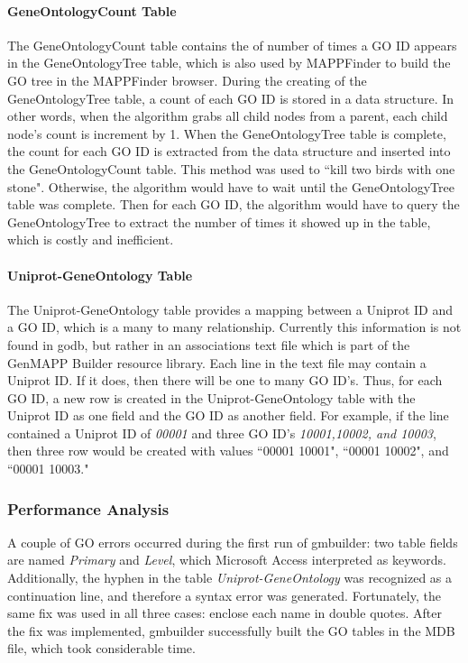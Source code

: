 \paragraph{GeneOntologyCount Table}
The GeneOntologyCount table contains the of number of times a GO ID appears in the GeneOntologyTree table, which
is also used by MAPPFinder to build the GO tree in the MAPPFinder browser. During the creating of the GeneOntologyTree
table, a count of each GO ID is stored in a data structure. In other words, when the algorithm grabs all child nodes from
a parent, each child node's count is increment by 1. When the GeneOntologyTree table is complete, the count for
each GO ID is extracted from the data structure and inserted into the GeneOntologyCount table.
This method was used to ``kill two birds with one stone". Otherwise,
the algorithm would have to wait until the GeneOntologyTree table was complete. Then for each GO ID, the algorithm would have
to query the GeneOntologyTree to extract the number of times it showed up in the table, which is costly and inefficient.


\paragraph{Uniprot-GeneOntology Table}
The Uniprot-GeneOntology table provides a mapping between a Uniprot ID and a GO ID, which is a many to many relationship.
Currently this information is not found in godb, but rather in an associations text file which is part of the GenMAPP Builder
resource library. Each line in the text file may contain a Uniprot ID. If it does, then there will be one to many GO ID's.
Thus, for each GO ID, a new row is created in the Uniprot-GeneOntology table with the Uniprot ID as one field and the GO ID
as another field. For example, if the line contained a Uniprot ID of \emph{00001} and three GO ID's \emph{10001,10002, and 10003},
then three row would be created with values ``00001 10001", ``00001 10002", and ``00001 10003."

\subsubsection{Performance Analysis}
A couple of GO errors occurred during the first run of gmbuilder: two table fields are named \emph{Primary} and \emph{Level}, which
Microsoft Access interpreted as keywords. Additionally, the hyphen in the table \emph{Uniprot-GeneOntology}
was recognized  as a continuation line, and therefore a syntax error was generated. Fortunately, the same fix was used
in all three cases: enclose each name in double quotes. After the fix was implemented, gmbuilder successfully built the
GO tables in the MDB file, which took considerable time.

